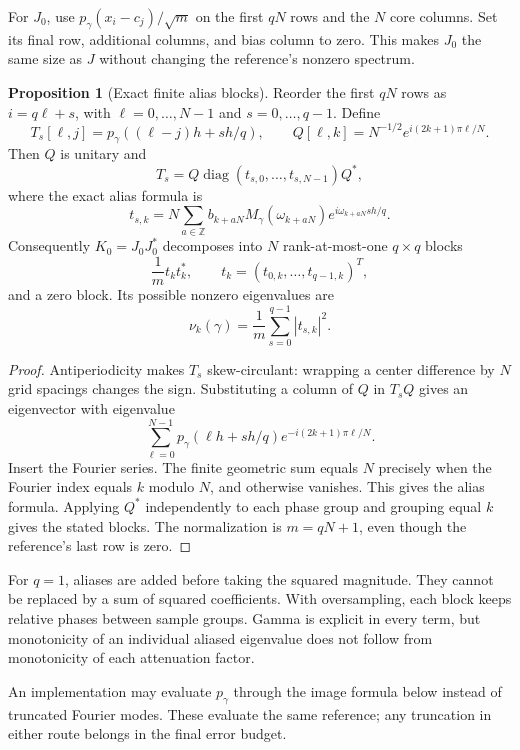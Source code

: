 \documentclass[11pt]{article}
\DeclareMathOperator{\diag}{diag}
\theoremstyle{definition}
\newtheorem{proposition}[lemma]{Proposition}
\begin{document}
For $J_0$, use $p_\gamma(x_i-c_j)/\sqrt m$ on the first $qN$ rows and
the $N$ core columns. Set its final row, additional columns, and bias column
to zero. This makes $J_0$ the same size as $J$ without changing the
reference's nonzero spectrum.

\begin{proposition}[Exact finite alias blocks]
Reorder the first $qN$ rows as $i=q\ell+s$, with $\ell=0,\ldots,N-1$ and
$s=0,\ldots,q-1$. Define
\[
T_s[\ell,j]=p_\gamma((\ell-j)h+sh/q),\qquad
Q[\ell,k]=N^{-1/2}e^{i(2k+1)\pi\ell/N}.
\]
Then $Q$ is unitary and
\[
T_s=Q\diag(t_{s,0},\ldots,t_{s,N-1})Q^*,
\]
where the exact alias formula is
\[
t_{s,k}=N\sum_{a\in\mathbb Z}
b_{k+aN}M_\gamma(\omega_{k+aN})
e^{i\omega_{k+aN}sh/q}.
\]
Consequently $K_0=J_0J_0^*$ decomposes into $N$ rank-at-most-one
$q\times q$ blocks
\[
\frac1m t_kt_k^*,\qquad t_k=(t_{0,k},\ldots,t_{q-1,k})^T,
\]
and a zero block. Its possible nonzero eigenvalues are
\[
\nu_k(\gamma)=\frac1m\sum_{s=0}^{q-1}|t_{s,k}|^2.
\]
\end{proposition}
\begin{proof}
Antiperiodicity makes $T_s$ skew-circulant: wrapping a center difference
by $N$ grid spacings changes the sign. Substituting a column of $Q$ in $T_sQ$
gives an eigenvector with eigenvalue
\[
\sum_{\ell=0}^{N-1}p_\gamma(\ell h+sh/q)
e^{-i(2k+1)\pi\ell/N}.
\]
Insert the Fourier series. The finite geometric sum equals $N$ precisely
when the Fourier index equals $k$ modulo $N$, and otherwise vanishes.
This gives the alias formula. Applying $Q^*$ independently to each phase
group and grouping equal $k$ gives the stated blocks. The normalization is
$m=qN+1$, even though the reference's last row is zero.
\end{proof}
For $q=1$, aliases are added before taking the squared magnitude. They
cannot be replaced by a sum of squared coefficients. With oversampling,
each block keeps relative phases between sample groups. Gamma is explicit
in every term, but monotonicity of an individual aliased eigenvalue does
not follow from monotonicity of each attenuation factor.

An implementation may evaluate $p_\gamma$ through the image formula below
instead of truncated Fourier modes. These evaluate the same reference;
any truncation in either route belongs in the final error budget.
\end{document}

